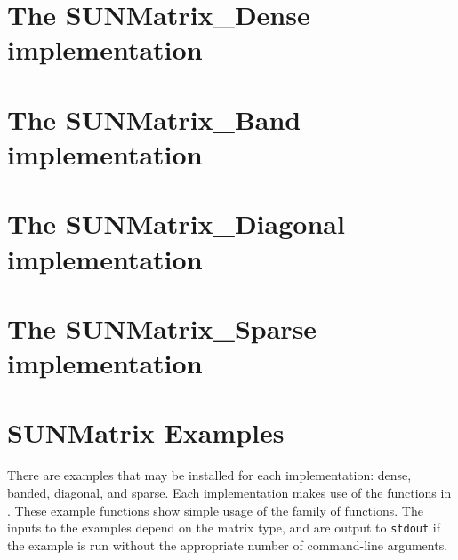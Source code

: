 \section{The SUNMatrix\_Dense implementation}\label{ss:sunmat_dense}


\section{The SUNMatrix\_Band implementation}\label{ss:sunmat_band}


\section{The SUNMatrix\_Diagonal implementation}\label{ss:sunmat_diag}


\section{The SUNMatrix\_Sparse implementation}\label{ss:sunmat_sparse}



\section{SUNMatrix Examples}\label{ss:sunmat_examples}

There are  examples that may be installed for each
implementation: dense, banded, diagonal, and sparse.  Each implementation
makes use of the functions in . 
These example functions show simple usage of the  family
of functions.  The inputs to the examples depend on the matrix type,
and are output to \texttt{stdout} if the example is run without the
appropriate number of command-line arguments. 

